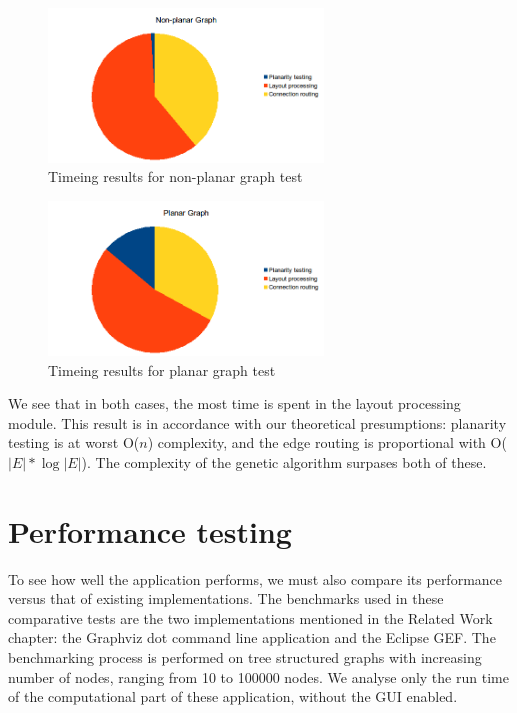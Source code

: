 \begin{figure}[ht] \centering
\includegraphics[width=0.65\textwidth]{img/results/nonplanartime.png}
\caption{Timeing results for non-planar graph test \label{pie1}} \end{figure}


\begin{figure}[ht] \centering
\includegraphics[width=0.65\textwidth]{img/results/planartime.png}
\caption{Timeing results for planar graph test \label{pie2}} \end{figure}

We see that in both cases, the most time is spent in the layout processing module. This result is in 
accordance with our theoretical presumptions: planarity testing is at worst O(${n}$) complexity, and the edge 
routing is proportional with O($|E| * \log |E|$). The complexity of the genetic algorithm surpases both of 
these.

\section{Performance testing}

To see how well the application performs, we must also compare its performance versus that of existing 
implementations. The benchmarks used in these comparative tests are the two implementations mentioned in the 
Related Work chapter: the Graphviz dot command line application and the Eclipse GEF. The benchmarking process 
is performed on tree structured graphs with increasing number of nodes, ranging from 10 to 100000 nodes. We 
analyse only the run time of the computational part of these application, without the GUI enabled.

